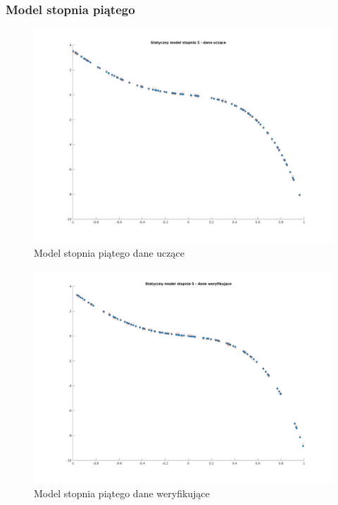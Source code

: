 \documentclass[a4paper, 11pt]{article}
\begin{document}
\subsubsection{Model stopnia piątego}
\begin{figure}[H]
\centering
\includegraphics[scale=0.50]{dane_stat_5_ucz.png}
\caption{Model stopnia piątego dane uczące}
\label{}
\end{figure}
\begin{figure}[H]
\centering
\includegraphics[scale=0.50]{dane_stat_5_wer.png}
\caption{Model stopnia piątego dane weryfikujące}
\label{}
\end{figure}
\end{document}

